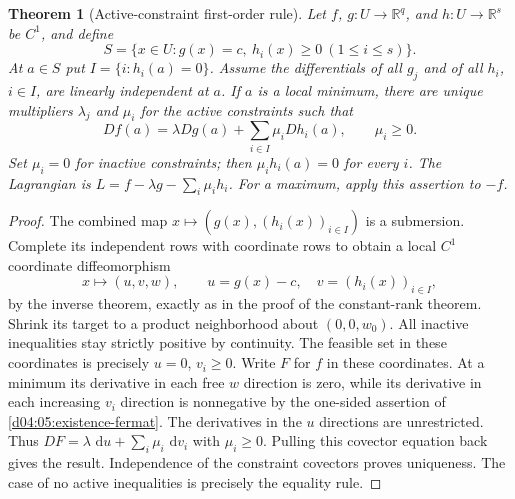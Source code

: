 \documentclass[11pt,oneside,openany]{book}
\newtheorem{theorem}{Theorem}[chapter]
\theoremstyle{definition}
\theoremstyle{remark}
\newcommand{\R}{\mathbb R}
\newcommand{\dd}{\,\mathrm d}
\begin{document}
\begin{theorem}[Active-constraint first-order rule]\label{d04:05:active-constraints}
Let $f$, $g:U\to\R^q$, and $h:U\to\R^s$ be $C^1$, and define
\[
 S=\{x\in U:g(x)=c,\ h_i(x)\geq0\ (1\leq i\leq s)\}.
\]
At $a\in S$ put $I=\{i:h_i(a)=0\}$. Assume the differentials of all
$g_j$ and of all $h_i$, $i\in I$, are linearly independent at $a$.
If $a$ is a local minimum, there are unique multipliers $\lambda_j$ and
$\mu_i$ for the active constraints such that
\[
 Df(a)=\lambda Dg(a)+\sum_{i\in I}\mu_iDh_i(a),\qquad \mu_i\geq0.
\]
Set $\mu_i=0$ for inactive constraints; then $\mu_ih_i(a)=0$ for every
$i$. The Lagrangian is $L=f-\lambda g-\sum_i\mu_i h_i$.
For a maximum, apply this assertion to $-f$.
\end{theorem}
\begin{proof}
The combined map $x\mapsto(g(x), (h_i(x))_{i\in I})$ is a submersion.
Complete its independent rows with coordinate rows to obtain a local $C^1$
coordinate diffeomorphism
\[
 x\longmapsto(u,v,w),\qquad
 u=g(x)-c,\quad v=(h_i(x))_{i\in I},
\]
by the inverse theorem, exactly as in the proof of the constant-rank theorem.
Shrink its target to a product neighborhood about $(0,0,w_0)$.
All inactive inequalities stay strictly positive by continuity.
The feasible set in these coordinates is precisely $u=0$, $v_i\geq0$.
Write $F$ for $f$ in these coordinates. At a minimum its derivative in
each free $w$ direction is zero, while its derivative in each increasing
$v_i$ direction is nonnegative by the one-sided assertion of
\cref{d04:05:existence-fermat}. The derivatives in the $u$ directions are
unrestricted. Thus
$DF=\lambda\,\dd u+\sum_i\mu_i\,\dd v_i$ with $\mu_i\geq0$.
Pulling this covector equation back gives the result. Independence of the
constraint covectors proves uniqueness. The case of no active inequalities
is precisely the equality rule.
\end{proof}
\end{document}
